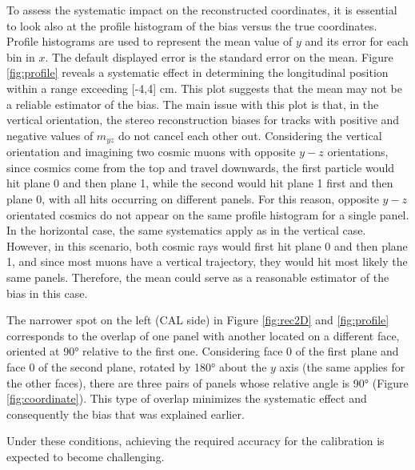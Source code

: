 To assess the systematic impact on the reconstructed coordinates, it is essential 
to look also at the profile histogram of the bias versus the true coordinates. 
Profile histograms are used to represent the mean value of $y$ and its error for each bin in $x$. 
The default displayed error is the standard error on the mean. 
Figure \ref{fig:profile} reveals a systematic effect in determining the 
longitudinal position within a range exceeding [-4,4] cm. 
This plot suggests that the mean may not be a reliable estimator 
of the bias. The main issue with this plot is that, in the vertical orientation, the stereo 
reconstruction biases for tracks with positive and negative values of 
$m_{yz}$ do not cancel each other out.
Considering the vertical orientation and imagining two cosmic muons  
with opposite $y-z$ orientations, since cosmics come from the top and travel 
downwards, the first particle would hit plane 0 and then plane 1, while the second 
would hit plane 1 first and then plane 0, with all hits occurring on different 
panels. For this reason, opposite $y-z$ orientated cosmics do not appear on the same profile 
histogram for a single panel. In the horizontal case, the same systematics apply as in the vertical case. 
However, in this scenario, both cosmic rays would first hit plane 0 and then 
plane 1, and since most muons have a vertical trajectory, they would hit most likely  
the same panels. Therefore, the mean could serve as a reasonable estimator of the bias in this case.

The narrower spot on the left (CAL side) in Figure \ref{fig:rec2D} and \ref{fig:profile} 
corresponds to the overlap of one panel with another located 
on a different face, oriented at 90° relative to the first one. 
Considering face 0 of the first plane and face 0 of the second plane, 
rotated by 180° about the $y$ axis (the same applies for the other faces), 
there are three pairs of panels whose relative angle is 90° (Figure \ref{fig:coordinate}). 
This type of overlap minimizes the systematic effect and consequently the bias that was explained earlier.

Under these conditions, achieving the required accuracy 
for the calibration is expected to become challenging. 


  
